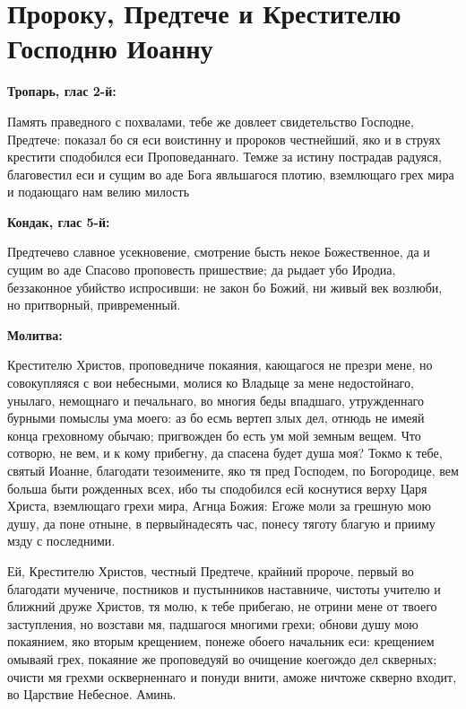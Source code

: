 \section{Пророку, Предтече и Крестителю Господню Иоанну}
 


\bfseries Тропарь, глас 2-й:\normalfont{}\nopagebreak


Память праведного с похвалами, тебе же довлеет свидетельство Господне, Предтече: показал бо ся еси воистинну и пророков честнейший, яко и в струях крестити сподобился еси Проповеданнаго. Темже за истину пострадав радуяся, благовестил еси и сущим во аде Бога явльшагося плотию, вземлющаго грех мира и подающаго нам велию милость


\medskip


\bfseries Кондак, глас 5-й:\normalfont{}\nopagebreak


Предтечево славное усекновение, смотрение бысть некое Божественное, да и сущим во аде Спасово проповесть пришествие; да рыдает убо Иродиа, беззаконное убийство испросивши: не закон бо Божий, ни живый век возлюби, но притворный, привременный.


\medskip


\bfseries Молитва:\normalfont{}\nopagebreak


Крестителю Христов, проповедниче покаяния, кающагося не презри мене, но совокупляяся с вои небесными, молися ко Владыце за мене недостойнаго, унылаго, немощнаго и печальнаго, во многия беды впадшаго, утружденнаго бурными помыслы ума моего: аз бо есмь вертеп злых дел, отнюдь не имеяй конца греховному обычаю; пригвожден бо есть ум мой земным вещем. Что сотворю, не вем, и к кому прибегну, да спасена будет душа моя? Токмо к тебе, святый Иоанне, благодати тезоимените, яко тя пред Господем, по Богородице, вем больша быти рожденных всех, ибо ты сподобился есй коснутися верху Царя Христа, вземлющаго грехи мира, Агнца Божия: Егоже моли за грешную мою душу, да поне отныне, в первыйнадесять час, понесу тяготу благую и прииму мзду с последними.


Ей, Крестителю Христов, честный Предтече, крайний пророче, первый во благодати мучениче, постников и пустынников наставниче, чистоты учителю и ближний друже Христов, тя молю, к тебе прибегаю, не отрини мене от твоего заступления, но возстави мя, падшагося многими грехи; обнови душу мою покаянием, яко вторым крещением, понеже обоего начальник еси: крещением омываяй грех, покаяние же проповедуяй во очищение коегождо дел скверных; очисти мя грехми оскверненнаго и понуди внити, аможе ничтоже скверно входит, во Царствие Небесное. Аминь.
\longpage{}\mychapterending

